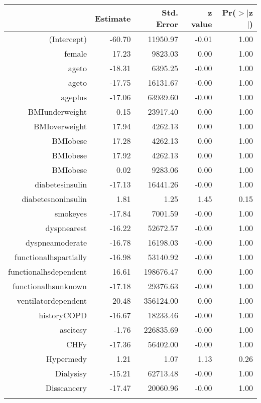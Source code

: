 \bigskip\bigskip
\centering
\begin{tabular}{rrrrr}
  \hline
 & Estimate & Std. Error & z value & Pr($>$$|$z$|$) \\ 
  \hline
(Intercept) & -60.70 & 11950.97 & -0.01 & 1.00 \\ 
  female & 17.23 & 9823.03 & 0.00 & 1.00 \\ 
  age\-65\-to\-74 & -18.31 & 6395.25 & -0.00 & 1.00 \\ 
  age\-75\-to\-84 & -17.75 & 16131.67 & -0.00 & 1.00 \\ 
  age\-85\-plus & -17.06 & 63939.60 & -0.00 & 1.00 \\ 
  BMI\-underweight & 0.15 & 23917.40 & 0.00 & 1.00 \\ 
  BMI\-overweight & 17.94 & 4262.13 & 0.00 & 1.00 \\ 
  BMI\-obese\-1 & 17.28 & 4262.13 & 0.00 & 1.00 \\ 
  BMI\-obese\-2 & 17.92 & 4262.13 & 0.00 & 1.00 \\ 
  BMI\-obese\-3 & 0.02 & 9283.06 & 0.00 & 1.00 \\ 
  diabetes\-insulin & -17.13 & 16441.26 & -0.00 & 1.00 \\ 
  diabetes\-noninsulin & 1.81 & 1.25 & 1.45 & 0.15 \\ 
  smoke\-yes & -17.84 & 7001.59 & -0.00 & 1.00 \\ 
  dyspnea\-rest & -16.22 & 52672.57 & -0.00 & 1.00 \\ 
  dyspnea\-moderate & -16.78 & 16198.03 & -0.00 & 1.00 \\ 
  functional\-hs\-partially & -16.98 & 53140.92 & -0.00 & 1.00 \\ 
  functional\-hs\-dependent & 16.61 & 198676.47 & 0.00 & 1.00 \\ 
  functional\-hs\-unknown & -17.18 & 29376.63 & -0.00 & 1.00 \\ 
  ventilator\-dependent & -20.48 & 356124.00 & -0.00 & 1.00 \\ 
  history\-COPD & -16.67 & 18233.46 & -0.00 & 1.00 \\ 
  ascites\-y & -1.76 & 226835.69 & -0.00 & 1.00 \\ 
  CHF\-y & -17.36 & 56402.00 & -0.00 & 1.00 \\ 
  Hyper\-med\-y & 1.21 & 1.07 & 1.13 & 0.26 \\ 
  Dialysis\-y & -15.21 & 62713.48 & -0.00 & 1.00 \\ 
  Diss\-cancer\-y & -17.47 & 20060.96 & -0.00 & 1.00 \\ 
$$
\end{tabular}
